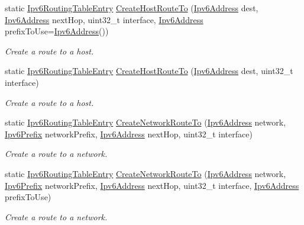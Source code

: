\begin{DoxyCompactItemize}
\item 
static \hyperlink{classns3_1_1Ipv6RoutingTableEntry}{Ipv6\+Routing\+Table\+Entry} \hyperlink{classns3_1_1Ipv6RoutingTableEntry_a6f518da617dfbbd9c363acf272450774}{Create\+Host\+Route\+To} (\hyperlink{classns3_1_1Ipv6Address}{Ipv6\+Address} dest, \hyperlink{classns3_1_1Ipv6Address}{Ipv6\+Address} next\+Hop, uint32\+\_\+t interface, \hyperlink{classns3_1_1Ipv6Address}{Ipv6\+Address} prefix\+To\+Use=\hyperlink{classns3_1_1Ipv6Address}{Ipv6\+Address}())
\begin{DoxyCompactList}\small\item\em Create a route to a host. \end{DoxyCompactList}\item 
static \hyperlink{classns3_1_1Ipv6RoutingTableEntry}{Ipv6\+Routing\+Table\+Entry} \hyperlink{classns3_1_1Ipv6RoutingTableEntry_a78d0f57be21504076639a6820c0090d9}{Create\+Host\+Route\+To} (\hyperlink{classns3_1_1Ipv6Address}{Ipv6\+Address} dest, uint32\+\_\+t interface)
\begin{DoxyCompactList}\small\item\em Create a route to a host. \end{DoxyCompactList}\item 
static \hyperlink{classns3_1_1Ipv6RoutingTableEntry}{Ipv6\+Routing\+Table\+Entry} \hyperlink{classns3_1_1Ipv6RoutingTableEntry_aba706b8378ac6a5ad281f773125175d9}{Create\+Network\+Route\+To} (\hyperlink{classns3_1_1Ipv6Address}{Ipv6\+Address} network, \hyperlink{classns3_1_1Ipv6Prefix}{Ipv6\+Prefix} network\+Prefix, \hyperlink{classns3_1_1Ipv6Address}{Ipv6\+Address} next\+Hop, uint32\+\_\+t interface)
\begin{DoxyCompactList}\small\item\em Create a route to a network. \end{DoxyCompactList}\item 
static \hyperlink{classns3_1_1Ipv6RoutingTableEntry}{Ipv6\+Routing\+Table\+Entry} \hyperlink{classns3_1_1Ipv6RoutingTableEntry_a3275d9ed02a553f205d567fbe4545be1}{Create\+Network\+Route\+To} (\hyperlink{classns3_1_1Ipv6Address}{Ipv6\+Address} network, \hyperlink{classns3_1_1Ipv6Prefix}{Ipv6\+Prefix} network\+Prefix, \hyperlink{classns3_1_1Ipv6Address}{Ipv6\+Address} next\+Hop, uint32\+\_\+t interface, \hyperlink{classns3_1_1Ipv6Address}{Ipv6\+Address} prefix\+To\+Use)
\begin{DoxyCompactList}\small\item\em Create a route to a network. \end{DoxyCompactList}\item 

\end{DoxyCompactItemize}
